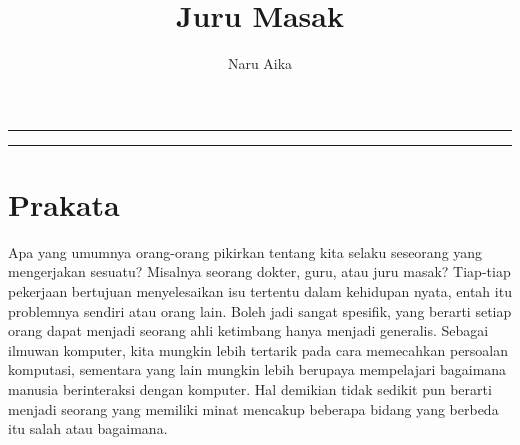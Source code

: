 \documentclass[smalldemyvopaper,11pt,twoside,onecolumn,openright,extrafontsizes]{memoir}
\title{Juru Masak}
\author{Naru Aika}
\newcommand{\ISBN}{0-000-00000-2}
\newcommand{\press}{}
\newcommand*\halftitlepage{\begingroup %
  \setlength\drop{0.1\textheight}
  \begin{center}
  \vspace*{\drop}
  \rule{\textwidth}{0in}\par
  {\Large\textsc\thetitle\par}
  \rule{\textwidth}{0in}\par
  \vfill
  \end{center}
\endgroup}
\newlength\drop{}
\newcommand*\titleM{\begingroup %
  \setlength\drop{0.15\textheight}
  \begin{center}
  \vspace*{\drop}
  \rule{\textwidth}{0in}\par
  {\HUGE\textsc\thetitle\par}
  \rule{\textwidth}{0in}\par
  {\Large\textit\theauthor\par}
  \vfill
  {\Large\scshape\press}
  \end{center}
\endgroup}
\begin{document}
\pagestyle{empty}
\titleM{}
\clearpage


\frontmatter{}
\pagestyle{mystyle}

\chapter*{Prakata}


Apa yang umumnya orang-orang pikirkan tentang kita selaku seseorang yang mengerjakan sesuatu? Misalnya seorang dokter, guru, atau juru masak? Tiap-tiap pekerjaan bertujuan menyelesaikan isu tertentu dalam kehidupan nyata, entah itu problemnya sendiri atau orang lain. Boleh jadi sangat spesifik, yang berarti setiap orang dapat menjadi seorang ahli ketimbang hanya menjadi generalis. Sebagai ilmuwan komputer, kita mungkin lebih tertarik pada cara memecahkan persoalan komputasi, sementara yang lain mungkin lebih berupaya mempelajari bagaimana manusia berinteraksi dengan komputer. Hal demikian tidak sedikit pun berarti menjadi seorang yang memiliki minat mencakup beberapa bidang yang berbeda itu salah atau bagaimana.

\end{document}

